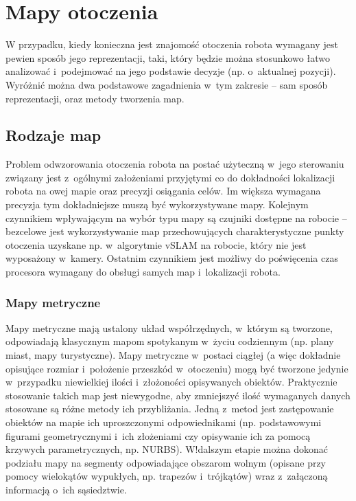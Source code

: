 \section{Mapy otoczenia}

W przypadku, kiedy konieczna jest znajomość otoczenia robota wymagany jest pewien
sposób jego reprezentacji, taki, który będzie można stosunkowo łatwo analizować
i~podejmować na jego podstawie decyzje (np. o~aktualnej pozycji). Wyróżnić
można dwa podstawowe zagadnienia w~tym zakresie -- sam sposób reprezentacji,
oraz metody tworzenia map.

\subsection{Rodzaje map}

Problem odwzorowania otoczenia robota na postać użyteczną w~jego sterowaniu
związany jest z~ogólnymi założeniami przyjętymi co do dokładności lokalizacji robota
na owej mapie oraz precyzji osiągania celów. Im większa wymagana precyzja
tym dokładniejsze muszą być wykorzystywane mapy. Kolejnym czynnikiem wpływającym
na wybór typu mapy są czujniki dostępne na robocie -- bezcelowe jest wykorzystywanie
map przechowujących charakterystyczne punkty otoczenia uzyskane np. w~algorytmie
vSLAM na robocie, który nie jest wyposażony w~kamery. Ostatnim czynnikiem
jest możliwy do poświęcenia czas procesora wymagany do obsługi samych map
i~lokalizacji robota.

\subsubsection{Mapy metryczne}

Mapy metryczne mają ustalony układ współrzędnych, w~którym są tworzone, odpowiadają
klasycznym mapom spotykanym w~życiu codziennym (np. plany miast, mapy turystyczne).
Mapy metryczne w~postaci ciągłej (a więc dokładnie opisujące rozmiar i~położenie
przeszkód w~otoczeniu) mogą być tworzone jedynie w~przypadku niewielkiej ilości
i~złożoności opisywanych obiektów. Praktycznie stosowanie takich map jest niewygodne,
aby zmniejszyć ilość wymaganych danych stosowane są różne metody ich przybliżania.
Jedną z~metod jest zastępowanie obiektów na mapie ich uproszczonymi odpowiednikami
(np. podstawowymi figurami geometrycznymi i~ich złożeniami czy opisywanie ich za pomocą
krzywych parametrycznych, np. NURBS). W!dalszym etapie można dokonać podziału mapy
na segmenty odpowiadające obszarom wolnym (opisane przy pomocy wielokątów wypukłych,
np. trapezów i~trójkątów) wraz z~załączoną informacją o~ich sąsiedztwie.

